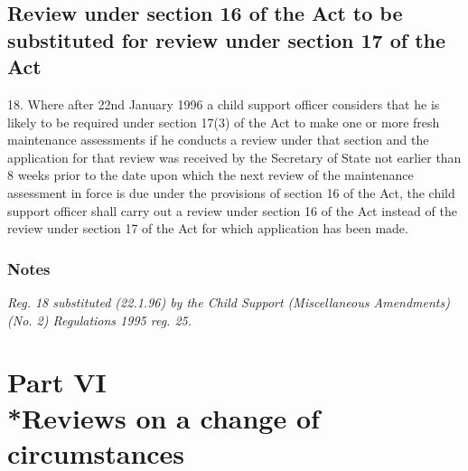 \documentclass[a4paper]{article}
\newcommand\amendment[1]{\subsubsection*{Notes}{\itshape\frenchspacing\footnotesize #1 \par}}
\begin{document}
%
%

\subsection[18. Review under section 16 of the Act to be substituted for review under section 17 of the Act]{Review under section 16 of the Act to be substituted for review under section 17 of the Act}

18.  Where after 22nd January 1996 a child support officer considers that he is likely to be required under section 17(3) of the Act to make one or more fresh maintenance assessments if he conducts a review under that section and the application for that review was received by the Secretary of State not earlier than 8 weeks prior to the date upon which the next review of the maintenance assessment in force is due under the provisions of section 16 of the Act, the child support officer shall carry out a review under section 16 of the Act instead of the review under section 17 of the Act for which application has been made.

\amendment{
Reg. 18 substituted (22.1.96) by the Child Support (Miscellaneous Amendments) (No. 2) Regulations 1995 reg. 25.
}

\section[Part VI --- Reviews on a change of circumstances]{Part VI\\*Reviews on a change of circumstances}
\end{document}

